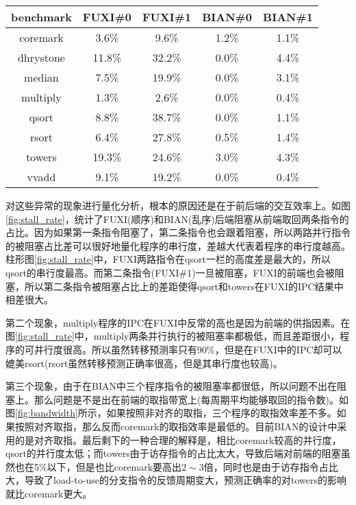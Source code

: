 \begin{table}[!htbp]
	\label{tab:stall_rate}
	\centering
	\footnotesize%
	\setlength{\tabcolsep}{4pt}%
	\renewcommand{\arraystretch}{1.2}%
	\begin{tabular}{ccccc}
		\hline
		benchmark   & FUXI\#0 & FUXI\#1 & BIAN\#0& BIAN\#1\\%
		\hline
		coremark    & 3.6\%  & 9.6\%  & 1.2\% & 1.1\% \\
		dhrystone   & 11.8\% & 32.2\% & 0.0\% & 4.4\% \\
		median 		& 7.5\%  & 19.9\% & 0.0\% & 3.1\% \\
		multiply 	& 1.3\%  & 2.6\%  & 0.0\% & 0.4\% \\
		qsort  		& 8.8\%  & 38.7\% & 0.0\% & 1.1\% \\
		rsort  		& 6.4\%  & 27.8\% & 0.5\% & 1.4\% \\
		towers 		& 19.3\% & 24.6\% & 3.0\% & 4.3\% \\
		vvadd 		& 9.1\%  & 19.2\% & 0.0\% & 0.4\% \\
		\hline
	\end{tabular}
\end{table}
	
对这些异常的现象进行量化分析，根本的原因还是在于前后端的交互效率上。如图\ref{fig:stall_rate}，统计了FUXI(顺序)和BIAN(乱序)后端阻塞从前端取回两条指令的占比。因为如果第一条指令阻塞了，第二条指令也会跟着阻塞，所以两路并行指令的被阻塞占比差可以很好地量化程序的串行度，差越大代表着程序的串行度越高。柱形图\ref{fig:stall_rate}中，FUXI两路指令在qsort一栏的高度差是最大的，所以qsort的串行度最高。而第二条指令(FUXI\#1)一旦被阻塞，FUXI的前端也会被阻塞，所以第二条指令被阻塞占比上的差距使得qsort和towers在FUXI的IPC结果中相差很大。

第二个现象，multiply程序的IPC在FUXI中反常的高也是因为前端的供指因素。在图\ref{fig:stall_rate}中，multiply两条并行执行的被阻塞率都极低，而且差距很小，程序的可并行度很高。所以虽然转移预测率只有90\%，但是在FUXI中的IPC却可以媲美rsort(rsort虽然转移预测正确率很高，但是其串行度也较高)。

第三个现象，由于在BIAN中三个程序指令的被阻塞率都很低，所以问题不出在阻塞上。那么问题是不是出在前端的取指带宽上(每周期平均能够取回的指令数)。如图\ref{fig:bandwidth}所示，如果按照非对齐的取指，三个程序的取指效率差不多。如果按照对齐取指，那么反而coremark的取指效率是最低的。目前BIAN的设计中采用的是对齐取指。最后剩下的一种合理的解释是，相比coremark较高的并行度，qsort的并行度太低；而towers由于访存指令的占比太大，导致后端对前端的阻塞虽然也在5\%以下，但是也比coremark要高出$2 \sim 3$倍，同时也是由于访存指令占比大，导致了load-to-use的分支指令的反馈周期变大，预测正确率的对towers的影响就比coremark更大。


